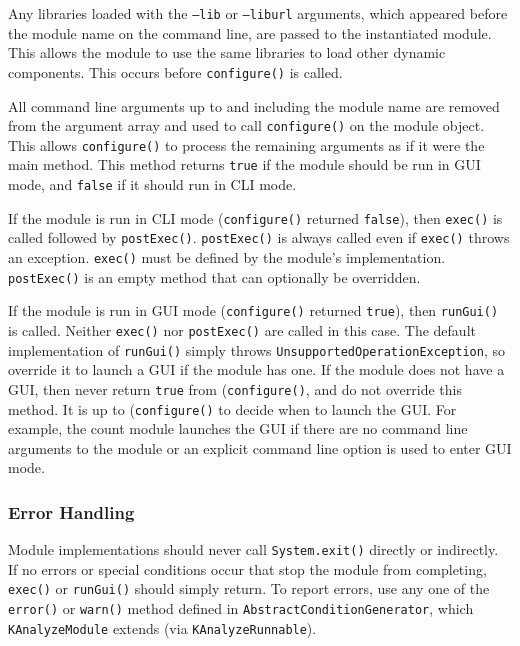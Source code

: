Any libraries loaded with the \texttt{--lib} or \texttt{--liburl} arguments, which appeared before the module name on the command line, are passed to the instantiated module. This allows the module to use the same libraries to load other dynamic components. This occurs before \texttt{configure()} is called.

All command line arguments up to and including the module name are removed from the argument array and used to call \texttt{configure()} on the module object. This allows \texttt{configure()} to process the remaining arguments as if it were the main method. This method returns \texttt{true} if the module should be run in GUI mode, and \texttt{false} if it should run in CLI mode.

If the module is run in CLI mode (\texttt{configure()} returned \texttt{false}), then \texttt{exec()} is called followed by \texttt{postExec()}. \texttt{postExec()} is always called even if \texttt{exec()} throws an exception. \texttt{exec()} must be defined by the module's implementation. \texttt{postExec()} is an empty method that can optionally be overridden.

If the module is run in GUI mode (\texttt{configure()} returned \texttt{true}), then
\texttt{runGui()} is called. Neither \texttt{exec()} nor \texttt{postExec()} are called in this case. The default implementation of \texttt{runGui()} simply throws \texttt{UnsupportedOperationException}, so override it to launch a GUI if the module has one. If the module does not have a GUI, then never return \texttt{true} from (\texttt{configure()}, and do not override this method. It is up to (\texttt{configure()} to decide when to launch the GUI. For example, the count module launches the GUI if there are no command line arguments to the module or an explicit command line option is used to enter GUI mode.

\subsubsection{Error Handling}
\label{sec.ext.mod.errors}

Module implementations should never call \texttt{System.exit()} directly or indirectly. If no errors or special conditions occur that stop the module from completing, \texttt{exec()} or \texttt{runGui()} should simply return. To report errors, use any one of the \texttt{error()} or \texttt{warn()} method defined in \texttt{AbstractConditionGenerator}, which \texttt{KAnalyzeModule} extends (via \texttt{KAnalyzeRunnable}).

